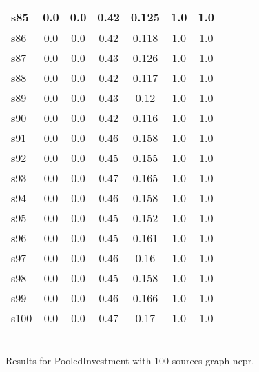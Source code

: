 \documentclass{article}
\begin{document}
\begin{tabular}{|l|c|c|c|c|c|c|}
\hline
s85 &0.0 & 0.0 & 0.42 & 0.125 & 1.0 & 1.0\\
\hline
s86 &0.0 & 0.0 & 0.42 & 0.118 & 1.0 & 1.0\\
\hline
s87 &0.0 & 0.0 & 0.43 & 0.126 & 1.0 & 1.0\\
\hline
s88 &0.0 & 0.0 & 0.42 & 0.117 & 1.0 & 1.0\\
\hline
s89 &0.0 & 0.0 & 0.43 & 0.12 & 1.0 & 1.0\\
\hline
s90 &0.0 & 0.0 & 0.42 & 0.116 & 1.0 & 1.0\\
\hline
s91 &0.0 & 0.0 & 0.46 & 0.158 & 1.0 & 1.0\\
\hline
s92 &0.0 & 0.0 & 0.45 & 0.155 & 1.0 & 1.0\\
\hline
s93 &0.0 & 0.0 & 0.47 & 0.165 & 1.0 & 1.0\\
\hline
s94 &0.0 & 0.0 & 0.46 & 0.158 & 1.0 & 1.0\\
\hline
s95 &0.0 & 0.0 & 0.45 & 0.152 & 1.0 & 1.0\\
\hline
s96 &0.0 & 0.0 & 0.45 & 0.161 & 1.0 & 1.0\\
\hline
s97 &0.0 & 0.0 & 0.46 & 0.16 & 1.0 & 1.0\\
\hline
s98 &0.0 & 0.0 & 0.45 & 0.158 & 1.0 & 1.0\\
\hline
s99 &0.0 & 0.0 & 0.46 & 0.166 & 1.0 & 1.0\\
\hline
s100 &0.0 & 0.0 & 0.47 & 0.17 & 1.0 & 1.0\\
\hline
\end{tabular}\\

\noindent Results for PooledInvestment with 100 sources graph ncpr.
\end{document}
